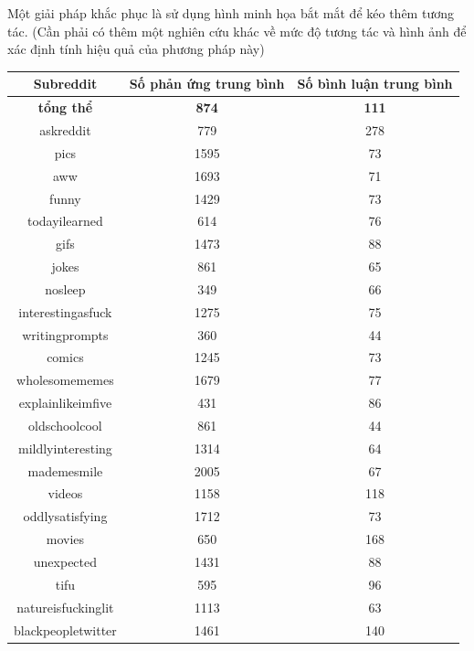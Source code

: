 \documentclass[10pt,a4paper]{article}
\begin{document}
Một giải pháp khắc phục là sử dụng hình minh họa bắt mắt để kéo thêm tương tác. (Cần phải có thêm một nghiên cứu khác về mức độ tương tác và hình ảnh để xác định tính hiệu quả của phương pháp này)

\begin{table}[hp]
    \centering
    \begin{tabular}{|c|c|c|}
        \hline
        Subreddit & Số phản ứng trung bình & Số bình luận trung bình \\
        \hline
        \textbf{tổng thể} & \textbf{874} & \textbf{111} \\
        \hline
        askreddit & 779 & 278 \\
        \hline
        pics & 1595 & 73 \\
        \hline
        aww & 1693 & 71 \\
        \hline
        funny & 1429 & 73 \\
        \hline
        todayilearned & 614 & 76 \\
        \hline
        gifs & 1473 & 88 \\
        \hline
        jokes & 861 & 65 \\
        \hline
        nosleep & 349 & 66 \\
        \hline
        interestingasfuck & 1275 & 75 \\
        \hline
        writingprompts & 360 & 44 \\
        \hline
        comics & 1245 & 73 \\
        \hline
        wholesomememes & 1679 & 77 \\
        \hline
        explainlikeimfive & 431 & 86 \\
        \hline
        oldschoolcool & 861 & 44 \\
        \hline
        mildlyinteresting & 1314 & 64 \\
        \hline
        mademesmile & 2005 & 67 \\
        \hline
        videos & 1158 & 118 \\
        \hline
        oddlysatisfying & 1712 & 73 \\
        \hline
        movies & 650 & 168 \\
        \hline
        unexpected & 1431 & 88 \\
        \hline
        tifu & 595 & 96 \\
        \hline
        natureisfuckinglit & 1113 & 63 \\
        \hline
        blackpeopletwitter & 1461 & 140 \\

\end{tabular}
\end{table}
\end{document}
